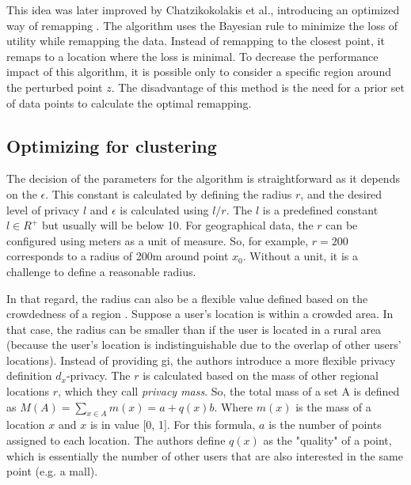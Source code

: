 This idea was later improved by Chatzikokolakis et al., introducing an optimized way of remapping \citep{chatzikokolakis_efficient_2017}.
The algorithm uses the Bayesian rule to minimize the loss of utility while remapping the data.
Instead of remapping to the closest point, it remaps to a location where the loss is minimal.
To decrease the performance impact of this algorithm, it is possible only to consider a specific region around the perturbed point $z$.
The disadvantage of this method is the need for a prior set of data points to calculate the optimal remapping.

\subsection{Optimizing for clustering} \label{2d:optimizing}
The decision of the parameters for the algorithm is straightforward as it depends on the $\epsilon$. \label{paragraph:choosing-r}
This constant is calculated by defining the radius $r$, and the desired level of privacy $l$ and $\epsilon$ is calculated using $l/r$.
The $l$ is a predefined constant $l \in R^+$ but usually will be below 10.
For geographical data, the $r$ can be configured using meters as a unit of measure.
So, for example, $r = 200$ corresponds to a radius of 200m around point $x_0$.
Without a unit, it is a challenge to define a reasonable radius.

In that regard, the radius can also be a flexible value defined based on the crowdedness of a region \citep{chatzikokolakis_constructing_2015}.
Suppose a user's location is within a crowded area.
In that case, the radius can be smaller than if the user is located in a rural area (because the user's location is indistinguishable due to the overlap of other users' locations).
Instead of providing \gls{gi}, the authors introduce a more flexible privacy definition $d_x$-privacy.
The $r$ is calculated based on the mass of other regional locations $r$, which they call \emph{privacy mass}.
So, the total mass of a set A is defined as $M(A) = \sum_{x \in A} m(x) = a + q(x)b$.
Where $m(x)$ is the mass of a location $x$ and $x$ is in value [0, 1].
For this formula, $a$ is the number of points assigned to each location.
The authors define $q(x)$ as the "quality" of a point, which is essentially the number of other users that are also interested in the same point (e.g. a mall).

